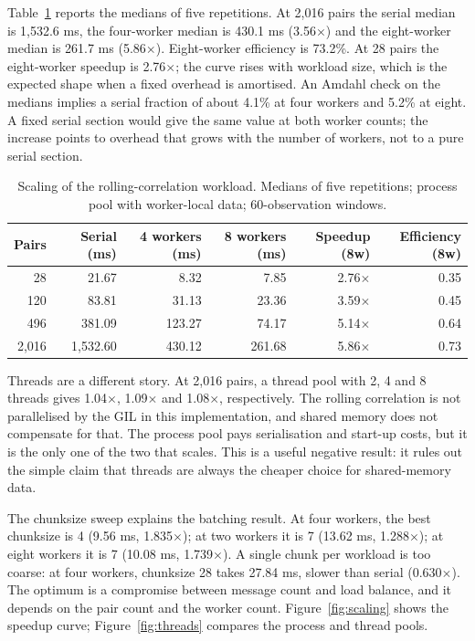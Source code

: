 \documentclass[journal]{IEEEtran}
\begin{document}
Table~\ref{tab:scaling} reports the medians of five repetitions. At 2,016 pairs the serial median is 1,532.6 ms, the four-worker median is 430.1 ms (3.56$\times$) and the eight-worker median is 261.7 ms (5.86$\times$). Eight-worker efficiency is 73.2\%. At 28 pairs the eight-worker speedup is 2.76$\times$; the curve rises with workload size, which is the expected shape when a fixed overhead is amortised. An Amdahl check \cite{amdahl1967} on the medians implies a serial fraction of about 4.1\% at four workers and 5.2\% at eight. A fixed serial section would give the same value at both worker counts; the increase points to overhead that grows with the number of workers, not to a pure serial section.

\begin{table}[t]
\caption{Scaling of the rolling-correlation workload. Medians of five repetitions; process pool with worker-local data; 60-observation windows.}
\label{tab:scaling}
\centering
\small
\renewcommand{\arraystretch}{1.15}
\begin{tabular}{rrrrrr}
\toprule
Pairs & Serial (ms) & 4 workers (ms) & 8 workers (ms) & Speedup (8w) & Efficiency (8w) \\
\midrule
28 & 21.67 & 8.32 & 7.85 & 2.76$\times$ & 0.35 \\
120 & 83.81 & 31.13 & 23.36 & 3.59$\times$ & 0.45 \\
496 & 381.09 & 123.27 & 74.17 & 5.14$\times$ & 0.64 \\
2,016 & 1,532.60 & 430.12 & 261.68 & 5.86$\times$ & 0.73 \\
\bottomrule
\end{tabular}
\end{table}

Threads are a different story. At 2,016 pairs, a thread pool with 2, 4 and 8 threads gives 1.04$\times$, 1.09$\times$ and 1.08$\times$, respectively. The rolling correlation is not parallelised by the GIL in this implementation, and shared memory does not compensate for that. The process pool pays serialisation and start-up costs, but it is the only one of the two that scales. This is a useful negative result: it rules out the simple claim that threads are always the cheaper choice for shared-memory data.

The chunksize sweep explains the batching result. At four workers, the best chunksize is 4 (9.56 ms, 1.835$\times$); at two workers it is 7 (13.62 ms, 1.288$\times$); at eight workers it is 7 (10.08 ms, 1.739$\times$). A single chunk per workload is too coarse: at four workers, chunksize 28 takes 27.84 ms, slower than serial (0.630$\times$). The optimum is a compromise between message count and load balance, and it depends on the pair count and the worker count. Figure~\ref{fig:scaling} shows the speedup curve; Figure~\ref{fig:threads} compares the process and thread pools.
\end{document}
